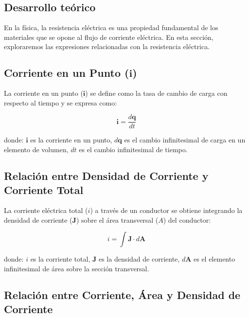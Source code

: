\documentclass{article}
\begin{document}

\begin{multicols}{2}
\section{Desarrollo teórico}\label{Desarrollo Teorico}                              	%
\cite{Fluke}
En la física, la resistencia eléctrica es una propiedad fundamental de los materiales que se opone al flujo de corriente eléctrica. En esta sección, exploraremos las expresiones relacionadas con la resistencia eléctrica.

\subsection{Corriente en un Punto ($\mathbf{i}$)}

La corriente en un punto ($\mathbf{i}$) se define como la tasa de cambio de carga con respecto al tiempo y se expresa como:

\begin{equation}
    \mathbf{i} = \frac{d\mathbf{q}}{dt}
\end{equation}

donde:
$\mathbf{i}$ es la corriente en un punto,
$d\mathbf{q}$ es el cambio infinitesimal de carga en un elemento de volumen,
$dt$ es el cambio infinitesimal de tiempo.

\subsection{Relación entre Densidad de Corriente y Corriente Total}

La corriente eléctrica total ($i$) a través de un conductor se obtiene integrando la densidad de corriente ($\mathbf{J}$) sobre el área transversal ($A$) del conductor:

\begin{equation}
    i = \int \mathbf{J} \cdot d\mathbf{A}
\end{equation}

donde:
$i$ es la corriente total,
$\mathbf{J}$ es la densidad de corriente,
$d\mathbf{A}$ es el elemento infinitesimal de área sobre la sección transversal.

\subsection{Relación entre Corriente, Área y Densidad de Corriente}


\end{multicols}
\end{document}
